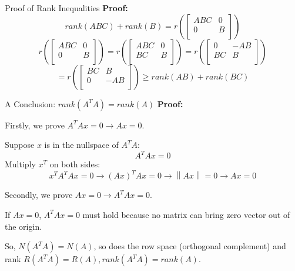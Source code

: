 \documentclass{beamer}
\begin{document}
\begin{frame}{Proof of Rank Inequalities}
\vspace{5pt}
\textbf{Proof:}
\begin{equation*}
    rank\left( ABC \right) +rank\left( B \right) =r\left( \left[ \begin{matrix}
        ABC&		0\\
        0&		B\\
    \end{matrix} \right] \right)
\end{equation*}
\begin{equation*}
    r\left( \left[ \begin{matrix}
        ABC&		0\\
        0&		B\\
    \end{matrix} \right] \right) =r\left( \left[ \begin{matrix}
        ABC&		0\\
        BC&		B\\
    \end{matrix} \right] \right) =r\left( \left[ \begin{matrix}
        0&		-AB\\
        BC&		B\\
    \end{matrix} \right] \right)
\end{equation*}
\begin{equation*}
    =r\left( \left[ \begin{matrix}
        BC&		B\\
        0&		-AB\\
    \end{matrix} \right] \right) \geqslant rank\left( AB \right) +rank\left( BC \right)
\end{equation*}
\end{frame}

\begin{frame}{A Conclusion: $rank(A^TA)=rank(A)$}
\textbf{Proof:}

Firstly, we prove $A^TAx=0\rightarrow Ax=0$.

\vspace{3pt}
Suppose $x$ is in the nullspace of $A^TA$:
\begin{equation*}
    A^TAx=0
\end{equation*}
Multiply $x^T$ on both sides:
\begin{equation*}
    x^TA^TAx=0\rightarrow \left( Ax \right) ^TAx=0\rightarrow \left\| Ax \right\| =0\rightarrow Ax=0
\end{equation*}

Secondly, we prove $Ax=0\rightarrow A^TAx=0$.

\vspace{3pt}
If $Ax=0$, $A^TAx=0$ must hold because no matrix can bring zero vector out of the origin.

\vspace{3pt}
So, $N(A^TA)=N(A)$, so does the row space (orthogonal complement) and rank $R(A^TA)=R(A), rank(A^TA)=rank(A)$.
\end{frame}
\end{document}
